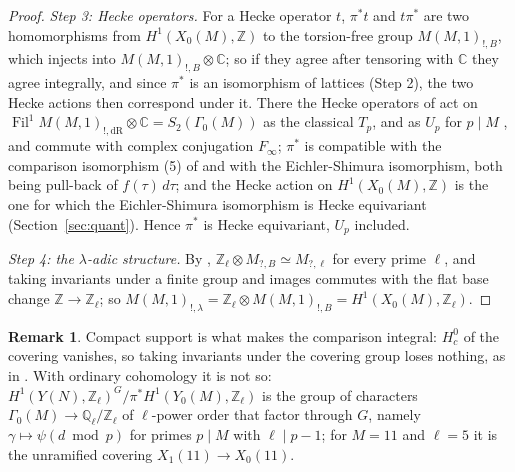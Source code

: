 \documentclass[11pt]{amsart}
\theoremstyle{definition}
\newtheorem{remark}[theorem]{Remark}
\newcommand{\Q}{\mathbb{Q}}
\newcommand{\Z}{\mathbb{Z}}
\newcommand{\C}{\mathbb{C}}
\begin{document}
\begin{proof}
\emph{Step 3: Hecke operators.} For a Hecke operator $t$, $\pi^*t$ and $t\pi^*$ are two homomorphisms from $H^1(X_0(M),\Z)$ to the torsion-free group $M(M,1)_{!,B}$, which injects into $M(M,1)_{!,B}\otimes\C$; so if they agree after tensoring with $\C$ they agree integrally, and since $\pi^*$ is an isomorphism of lattices (Step 2), the two Hecke actions then correspond under it. There the Hecke operators of \cite{DFG04} act on $\operatorname{Fil}^1M(M,1)_{!,\mathrm{dR}}\otimes\C=S_2(\Gamma_0(M))$ as the classical $T_p$, and as $U_p$ for $p\mid M$ \cite[Proposition 1.3]{DFG04}, and commute with complex conjugation $F_\infty$; $\pi^*$ is compatible with the comparison isomorphism (5) of \cite{DFG04} and with the Eichler-Shimura isomorphism, both being pull-back of $f(\tau)\,d\tau$; and the Hecke action on $H^1(X_0(M),\Z)$ is the one for which the Eichler-Shimura isomorphism is Hecke equivariant (Section~\ref{sec:quant}). Hence $\pi^*$ is Hecke equivariant, $U_p$ included.

\emph{Step 4: the $\lambda$-adic structure.} By \cite[\S1.2.3]{DFG04}, $\Z_\ell\otimes M_{?,B}\simeq M_{?,\ell}$ for every prime $\ell$, and taking invariants under a finite group and images commutes with the flat base change $\Z\to\Z_\ell$; so $M(M,1)_{!,\lambda}=\Z_\ell\otimes M(M,1)_{!,B}=H^1(X_0(M),\Z_\ell)$.
\end{proof}

\begin{remark}
Compact support is what makes the comparison integral: $H^0_c$ of the covering vanishes, so taking invariants under the covering group loses nothing, as in \cite[Lemma 1.1]{DFG04}. With ordinary cohomology it is not so: $H^1(Y(N),\Z_\ell)^G/\pi^*H^1(Y_0(M),\Z_\ell)$ is the group of characters $\Gamma_0(M)\to\Q_\ell/\Z_\ell$ of $\ell$-power order that factor through $G$, namely $\gamma\mapsto\psi(d\bmod p)$ for primes $p\mid M$ with $\ell\mid p-1$; for $M=11$ and $\ell=5$ it is the unramified covering $X_1(11)\to X_0(11)$.
\end{remark}
\end{document}
